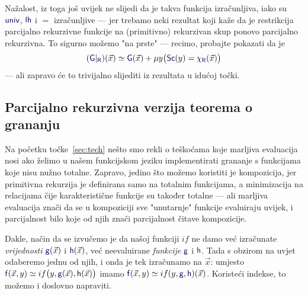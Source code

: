 \begin{napomena}[{name=[restrikcija na izračunljiv skup čuva izračunljivost]}]\label{nap:restrprek}
Nažalost, iz toga još uvijek ne slijedi da je takva funkcija izračunljiva, iako su $\f{univ}$, $\f{lh}$ i $=$ izračunljive --- jer trebamo neki rezultat koji kaže da je restrikcija parcijalno rekurzivne funkcije na (primitivno) rekurzivan skup ponovo parcijalno rekurzivna. To sigurno možemo "na prste" --- recimo, probajte pokazati da je 
    \begin{equation}\label{eq:restrprek}
        (\f G|_{\f R})(\vec x)\simeq\f G(\vec x)+\mu y\bigl(\f{Sc}(y)\eq\chi_{\f R}(\vec x)\bigr)
\end{equation}
--- ali zapravo će to trivijalno slijediti iz rezultata u idućoj točki. %
\end{napomena}

\subsection{Parcijalno rekurzivna verzija teorema o grananju}

Na početku točke~\ref{sec:tech} nešto smo rekli o teškoćama koje marljiva evaluacija nosi ako želimo u našem funkcijskom jeziku implementirati grananje s funkcijama koje nisu nužno totalne. Zapravo, jedino što možemo koristiti je kompozicija, jer primitivna rekurzija je definirana samo na totalnim funkcijama, a minimizacija na relacijama čije karakteristične funkcije su također totalne --- ali marljiva evaluacija znači da se u kompoziciji sve "unutarnje" funkcije evaluiraju uvijek, i parcijalnost bilo koje od njih znači parcijalnost čitave kompozicije.

Dakle, način da se izvučemo je da našoj funkciji $if$ ne damo već izračunate \emph{vrijednosti} $\f g(\vec x)$ i $\f h(\vec x)$, već neevaluirane \emph{funkcije} $\f g$ i $\f h$. Tada s obzirom na uvjet odaberemo jednu od njih, i onda je tek izračunamo na $\vec x$: umjesto $\f f(\vec x,y)\simeq if\bigl(y,\f g(\vec x),\f h(\vec x)\bigr)$ imamo $\f f(\vec x,y)\simeq if(y,\f g,\f h)(\vec x)$. Koristeći indekse, to možemo i doslovno napraviti.


